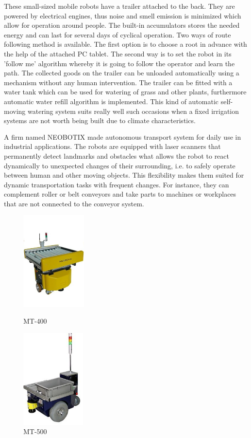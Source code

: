 \documentclass[12pt,english]{article}
\begin{document}
\noindent These small-sized mobile robots have a trailer attached to the back. They are powered by electrical engines, thus noise and smell emission is minimized which allow for operation around people. The built-in accumulators stores the needed energy and can last for several days of cyclical operation. Two ways of route following method is available. The first option is to choose a root in advance with the help of the attached PC tablet. The second way is to set the robot in its 'follow me' algorithm whereby it is going to follow the operator and learn the path. The collected goods on the trailer can be unloaded automatically using a mechanism without any human intervention. The trailer can be fitted with a water tank which can be used for watering of grass and other plants, furthermore automatic water refill algorithm is implemented. This kind of automatic self-moving watering system suits really well such occasions when a fixed irrigation systems are not worth being built due to climate characteristics.\cite{smp}

A firm named NEOBOTIX made autonomous transport system for daily use in industrial applications. The robots are equipped with laser scanners that permanently detect landmarks and obstacles what allows the robot to react dynamically to unexpected changes of their surrounding, i.e. to safely operate between human and other moving objects. This flexibility makes them suited for dynamic transportation tasks with frequent changes. For instance, they can complement roller or belt conveyors and take parts to machines or workplaces that are not connected to the conveyor system. \cite{neo}

\begin{figure}[h]
	\centering
	\centering
	\includegraphics[height=5cm]{neo1.jpg}
	\caption{{\small MT-400}}
	\endminipage\hfill
	\centering
	\includegraphics[height=5cm]{neo2.jpg}
	\caption{{\small MT-500}}
	\label{conv2}
	\endminipage\hfill
\end{figure} 
\end{document}
